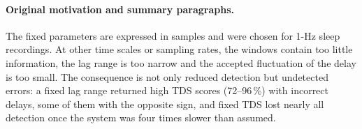 \documentclass[11pt,a4paper]{article}
\begin{document}
\paragraph{Original motivation and summary paragraphs.} The fixed parameters are expressed in samples and were chosen for 1-Hz sleep recordings. At other time scales or sampling rates, the windows contain too little information, the lag range is too narrow and the accepted fluctuation of the delay is too small. The consequence is not only reduced detection but undetected errors: a fixed lag range returned high TDS scores (72--96\,\%) with incorrect delays, some of them with the opposite sign, and fixed TDS lost nearly all detection once the system was four times slower than assumed.



\end{document}
